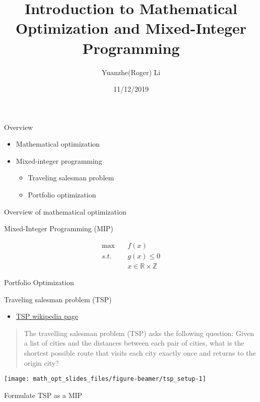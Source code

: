 \documentclass[
  ignorenonframetext,
]{beamer}
\title{Introduction to Mathematical Optimization and Mixed-Integer Programming}
\author{Yuanzhe(Roger) Li}
\date{11/12/2019}
\providecommand{\tightlist}{%
  \setlength{\itemsep}{0pt}\setlength{\parskip}{0pt}}
\begin{document}
\frame{\titlepage}

\begin{frame}{Overview}
\protect\hypertarget{overview}{}

\begin{itemize}
\tightlist
\item
  Mathematical optimization
\item
  Mixed-integer programming

  \begin{itemize}
  \tightlist
  \item
    Traveling salesman problem
  \item
    Portfolio optimization
  \end{itemize}
\end{itemize}

\end{frame}

\begin{frame}{Overview of mathematical optimization}
\protect\hypertarget{overview-of-mathematical-optimization}{}

\end{frame}

\begin{frame}{Mixed-Integer Programming (MIP)}
\protect\hypertarget{mixed-integer-programming-mip}{}

\[\begin{aligned}
\max \quad & f(x)\\
s.t. \quad & g(x) \leq 0 \\
& x \in \mathbb{R} \times \mathbb{Z}
\end{aligned}\]

\end{frame}

\begin{frame}{Portfolio Optimization}
\protect\hypertarget{portfolio-optimization}{}

\end{frame}

\begin{frame}{Traveling salesman problem (TSP)}
\protect\hypertarget{traveling-salesman-problem-tsp}{}

\begin{itemize}
\tightlist
\item
  \href{https://en.wikipedia.org/wiki/Travelling_salesman_problem}{TSP
  wikipedia page}
\end{itemize}

\begin{quote}
The travelling salesman problem (TSP) asks the following question: Given
a list of cities and the distances between each pair of cities, what is
the shortest possible route that visits each city exactly once and
returns to the origin city?
\end{quote}

\begin{center}\texttt{[image: math\_opt\_slides\_files/figure-beamer/tsp\_setup-1]} \end{center}

\end{frame}

\begin{frame}{Formulate TSP as a MIP}
\protect\hypertarget{formulate-tsp-as-a-mip}{}

\end{frame}
\end{document}
